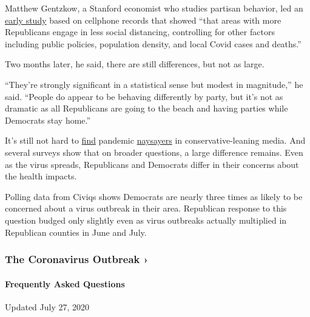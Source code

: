Matthew Gentzkow, a Stanford economist who studies partisan behavior,
led an
\href{http://web.stanford.edu/~gentzkow/research/social_distancing.pdf}{early
study} based on cellphone records that showed ``that areas with more
Republicans engage in less social distancing, controlling for other
factors including public policies, population density, and local Covid
cases and deaths.''

Two months later, he said, there are still differences, but not as
large.

``They're strongly significant in a statistical sense but modest in
magnitude,'' he said. ``People do appear to be behaving differently by
party, but it's not as dramatic as all Republicans are going to the
beach and having parties while Democrats stay home.''

It's still not hard to
\href{https://www.washingtontimes.com/news/2020/jul/15/rush-limbaugh-americans-should-adapt-to-coronaviru/}{find}
pandemic \href{https://www.youtube.com/watch?v=Lhx_XBUTOI0}{naysayers}
in conservative-leaning media. And several surveys show that on broader
questions, a large difference remains. Even as the virus spreads,
Republicans and Democrats differ in their concerns about the health
impacts.

Polling data from Civiqs shows Democrats are nearly three times as
likely to be concerned about a virus outbreak in their area. Republican
response to this question budged only slightly even as virus outbreaks
actually multiplied in Republican counties in June and July.

\href{https://www.nytimes.com/news-event/coronavirus?action=click\&pgtype=Article\&state=default\&region=MAIN_CONTENT_3\&context=storylines_faq}{}

\hypertarget{the-coronavirus-outbreak-}{%
\subsubsection{The Coronavirus Outbreak
›}\label{the-coronavirus-outbreak-}}

\hypertarget{frequently-asked-questions}{%
\paragraph{Frequently Asked
Questions}\label{frequently-asked-questions}}

Updated July 27, 2020

